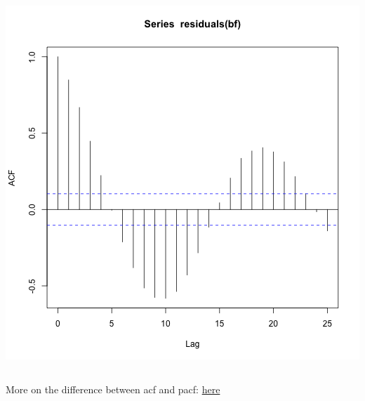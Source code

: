 \documentclass{beamer}
\begin{document}
\begin{frame}[fragile]
\begin{columns}
\begin{column}{0.5\textwidth}
        \includegraphics[width=\textwidth]{lectures/day_4_GLS/figures/unnamed-chunk-22-1.png}  
      \end{column}
  \end{columns}
  \footnotesize More on the difference between acf and pacf: \color{blue}\href{https://stats.stackexchange.com/questions/483383/difference-between-autocorrelation-and-partial-autocorrelation}{here}
\end{frame}
\end{document}
